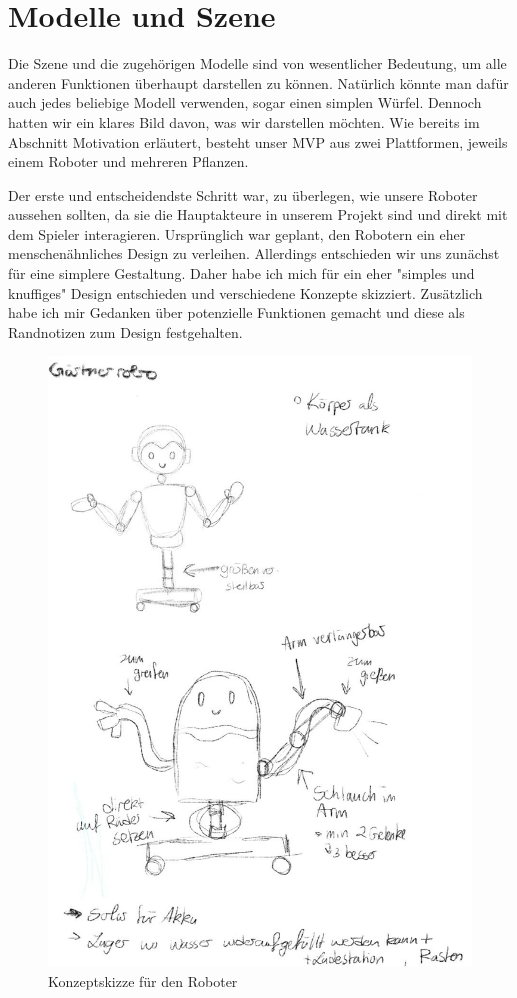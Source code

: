 \section{Modelle und Szene}

Die Szene und die zugehörigen Modelle sind von wesentlicher Bedeutung, um alle anderen Funktionen überhaupt darstellen zu können. Natürlich könnte man dafür auch jedes beliebige Modell verwenden, sogar einen simplen Würfel. Dennoch hatten wir ein klares Bild davon, was wir darstellen möchten. Wie bereits im Abschnitt Motivation erläutert, besteht unser MVP aus zwei Plattformen, jeweils einem Roboter und mehreren Pflanzen.
\par
Der erste und entscheidendste Schritt war, zu überlegen, wie unsere Roboter aussehen sollten, da sie die Hauptakteure in unserem Projekt sind und direkt mit dem Spieler interagieren. Ursprünglich war geplant, den Robotern ein eher menschenähnliches Design zu verleihen. Allerdings entschieden wir uns zunächst für eine simplere Gestaltung. Daher habe ich mich für ein eher "simples und knuffiges" Design entschieden und verschiedene Konzepte skizziert. Zusätzlich habe ich mir Gedanken über potenzielle Funktionen gemacht und diese als Randnotizen zum Design festgehalten.
\begin{figure}[h]
	\centering
	\includegraphics[height=0.3\pageheight,keepaspectratio]{pics/1} 
	\caption{Konzeptskizze für den Roboter}
\end{figure}

